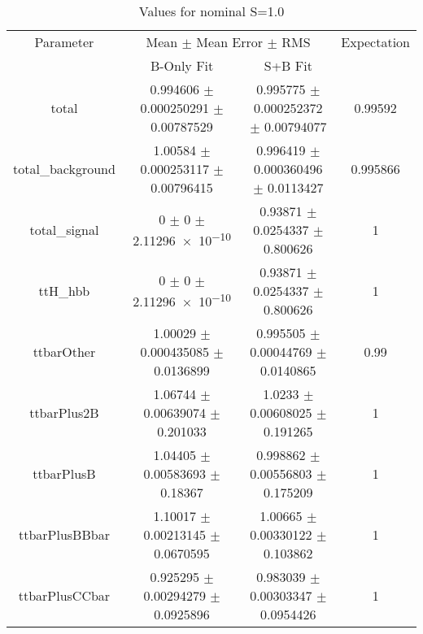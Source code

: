 \begin{table}
\centering
\caption{Values for nominal S=1.0}
\begin{tabular}{cccc}
\toprule
Parameter & \multicolumn{2}{c}{Mean $\pm$ Mean Error $\pm$ RMS} & Expectation\\
 & B-Only Fit & S+B Fit & \\
\midrule
total & \num{0.994606} $\pm$ \num{0.000250291} $\pm$ \num{0.00787529} & \num{0.995775} $\pm$ \num{0.000252372} $\pm$ \num{0.00794077} & \num{0.99592}\\
total\_background & \num{1.00584} $\pm$ \num{0.000253117} $\pm$ \num{0.00796415} & \num{0.996419} $\pm$ \num{0.000360496} $\pm$ \num{0.0113427} & \num{0.995866}\\
total\_signal & \num{0} $\pm$ \num{0} $\pm$ \num{2.11296e-10} & \num{0.93871} $\pm$ \num{0.0254337} $\pm$ \num{0.800626} & \num{1}\\
ttH\_hbb & \num{0} $\pm$ \num{0} $\pm$ \num{2.11296e-10} & \num{0.93871} $\pm$ \num{0.0254337} $\pm$ \num{0.800626} & \num{1}\\
ttbarOther & \num{1.00029} $\pm$ \num{0.000435085} $\pm$ \num{0.0136899} & \num{0.995505} $\pm$ \num{0.00044769} $\pm$ \num{0.0140865} & \num{0.99}\\
ttbarPlus2B & \num{1.06744} $\pm$ \num{0.00639074} $\pm$ \num{0.201033} & \num{1.0233} $\pm$ \num{0.00608025} $\pm$ \num{0.191265} & \num{1}\\
ttbarPlusB & \num{1.04405} $\pm$ \num{0.00583693} $\pm$ \num{0.18367} & \num{0.998862} $\pm$ \num{0.00556803} $\pm$ \num{0.175209} & \num{1}\\
ttbarPlusBBbar & \num{1.10017} $\pm$ \num{0.00213145} $\pm$ \num{0.0670595} & \num{1.00665} $\pm$ \num{0.00330122} $\pm$ \num{0.103862} & \num{1}\\
ttbarPlusCCbar & \num{0.925295} $\pm$ \num{0.00294279} $\pm$ \num{0.0925896} & \num{0.983039} $\pm$ \num{0.00303347} $\pm$ \num{0.0954426} & \num{1}\\
\bottomrule
\end{tabular}
\end{table}